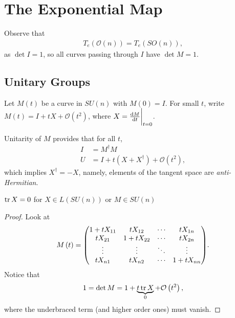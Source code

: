 
\section{The Exponential Map}



Observe that
\begin{align}
    T_e \left( \mathcal{O}\left( n \right)  \right) = T_e \left( SO \left( n \right)  \right) 
,\end{align}
as $\det I = 1$, so all curves passing through $I$ have $\det M = 1$.

\subsection{Unitary Groups}



Let $M\left( t \right) $ be a curve in $SU \left( n \right) $ with $ M \left( 0 \right) = I$. For small $t$, write $M \left( t \right) = I + t X + \mathcal{O}\left( t^2 \right) $, where $X = \dv{M}{t} \bigg|_{t=0}$. 

Unitarity of $M$ provides that for all $t$,
\begin{align}
    I &= M^{\dag} M \\
    U &= I + t \left( X + X^{\dag} \right) + \mathcal{O}\left( t^2 \right) 
,\end{align}
which implies $X^{\dag} = -X$, namely, elements of the tangent space are \textit{anti-Hermitian}.

\begin{claim}
    $\tr X = 0$ for $X \in L \left( SU \left( n \right)  \right)$ or $M \in SU \left( n \right) $
\end{claim}

\begin{proof}
    Look at
    \begin{align}
        M\left( t \right) = \mqty( 1 + t X_{11} & t X_{12} & \cdots & t X_{1n} \\
        t X_{21} & 1 + t X_{22} & \cdots & tX_{2n} \\
        \vdots & \vdots & \ddots & \vdots \\
        t X_{n1} & t X_{n2} & \cdots & 1 + t X_{n n} )
    .\end{align}
    Notice that
    \begin{align}
        1 = \det M = 1 + \underbrace{t \tr X}_{0} + \mathcal{O} \left( t^2 \right) 
    ,\end{align}
    where the underbraced term (and higher order ones) must vanish.
\end{proof}

